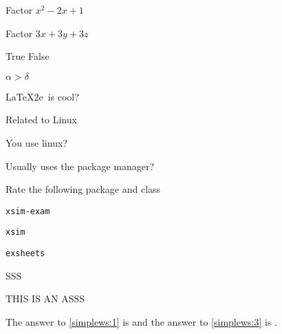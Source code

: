 \documentclass{article}
\begin{document}
\begin{enumext}[save-ans=simplews,columns=2,check-ans=true,show-ans=true,nosep,save-ref=true,wrap-label={\tikz[scale=0.25]\duck[signpost=\scalebox{0.6}{#1}];}]
  \item Factor $x^{2}-2x+1$ %

  \begin{anskey*}
  \end{anskey*}

  \item Factor $3x+3y+3z$  %
  \item True False
    \begin{enumext}[nosep]
      \item $\alpha > \delta$  %
      \item \LaTeX2e\ is cool? 
    \end{enumext}
  \item Related to Linux
    \begin{enumext}[nosep]
      \item You use linux? 
      \item Usually uses the package manager? 
      \item Rate the following package and class
        \begin{enumext}[no-store]
          \item \texttt{xsim-exam} 
          \item \texttt{xsim} 
          \item \texttt{exsheets} 
          \begin{anskey*}[item-star,force-eol=false]
             SSS
           \end{anskey*}
        \end{enumext}
          \begin{anskey*}[item-star,force-eol=false]
             THIS IS AN ASSS
           \end{anskey*}
    \end{enumext}
\end{enumext}

The answer to \ref{simplews:1} is  and the answer
to \ref{simplews:3} is .

\end{document}
